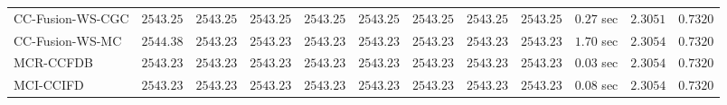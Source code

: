 \begin{table}[H]
\begin{tabular}{lrrrrrrrrrrr}
    CC-Fusion-WS-CGC & $      2543.25$ & $      2543.25$ & $      2543.25$ & $      2543.25$ & $      2543.25$ & $      2543.25$ & $      2543.25$ & $      2543.25$ & $         0.27$ sec    & $       2.3051$  & $       0.7320$ \\ 
     CC-Fusion-WS-MC & $      2544.38$ & $      2543.23$ & $      2543.23$ & $      2543.23$ & $      2543.23$ & $      2543.23$ & $      2543.23$ & $      2543.23$ & $         1.70$ sec    & $       2.3054$  & $       0.7320$ \\ 
\cmidrule{1-1} 
           MCR-CCFDB & $      2543.23$ & $      2543.23$ & $      2543.23$ & $      2543.23$ & $      2543.23$ & $      2543.23$ & $      2543.23$ & $      2543.23$ & $         0.03$ sec    & $       2.3054$  & $       0.7320$ \\ 
\cmidrule{1-1} 
           MCI-CCIFD & $      2543.23$ & $      2543.23$ & $      2543.23$ & $      2543.23$ & $      2543.23$ & $      2543.23$ & $      2543.23$ & $      2543.23$ & $         0.08$ sec    & $       2.3054$  & $       0.7320$ \\ 
\bottomrule
\end{tabular}
\end{table}

